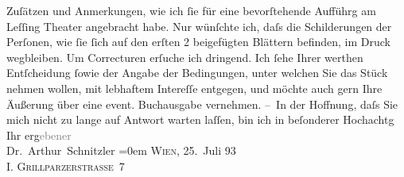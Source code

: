 \begin{ledgroupsized}[t]{13cm}
                    Zuſätzen und Anmerkungen, wie ich ſie für eine bevorſtehende Aufführg am Leſſing Theater angebracht habe. Nur wünſchte
                    ich, daſs die Schilderungen der Perſonen, wie ſie ſich auf den erſten 2
                    beigefügten Blättern befinden, im Druck wegbleiben.\pend
           \pstart
           {\pb}Um Correcturen erſuche ich dringend.\pend
           \pstart
           Ich ſehe Ihrer werthen Entſcheidung ſowie der Angabe der Bedingungen, unter
                    welchen Sie das Stück nehmen wollen, mit
                    lebhaftem Intereſſe entgegen, und möchte auch gern Ihre Äußerung über eine
                    event. Buchausgabe vernehmen.\pend
           \pstart
           – In der Hoffnung, daſs {\pb}Sie mich nicht zu lange auf
                    Antwort warten laſſen, bin ich in beſonderer Hochachtg\pend
           \pstart
           Ihr erg\textcolor{gray}{ebener}{\\[\baselineskip]}\spacefill\mbox{Dr. Arthur Schnitzler}\pend
           \leftskip=0em{}\pstart
           \textsc{Wien}, 25. Juli 93{\\}\textsc{I. Grillparzerstraße 7}\pend
           \endnumbering{}\end{ledgroupsized}  \newcommand{\dateiname}{L00242}\newcommand{\titel}{Arthur Schnitzler an Samuel Fischer, 25. 7. 1893}\newcommand{\editorInnen}{Martin Anton Müller und Gerd-Hermann Susen}
            \footnotesize
\begin{ledgroupsized}[t]{11.5cm}
\end{ledgroupsized}
         
      